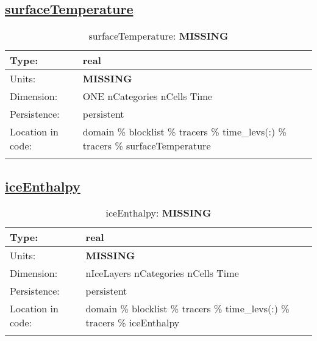 \subsection[surfaceTemperature]{\hyperref[sec:var_tab_tracers]{surfaceTemperature}}
\label{subsec:var_sec_tracers_surfaceTemperature}
\begin{center}
\begin{longtable}{| p{2.0in} | p{4.0in} |}
        \hline 
        Type: & real \\
        \hline 
        Units: & {\bf \color{red} MISSING} \\
        \hline 
        Dimension: & ONE nCategories nCells Time \\
        \hline 
        Persistence: & persistent \\
        \hline 
         Location in code: & domain \% blocklist \% tracers \% time\_levs(:) \% tracers \% surfaceTemperature \\
         \hline 
    \caption{surfaceTemperature: {\bf \color{red} MISSING}}
\end{longtable}
\end{center}
\subsection[iceEnthalpy]{\hyperref[sec:var_tab_tracers]{iceEnthalpy}}
\label{subsec:var_sec_tracers_iceEnthalpy}
\begin{center}
\begin{longtable}{| p{2.0in} | p{4.0in} |}
        \hline 
        Type: & real \\
        \hline 
        Units: & {\bf \color{red} MISSING} \\
        \hline 
        Dimension: & nIceLayers nCategories nCells Time \\
        \hline 
        Persistence: & persistent \\
        \hline 
         Location in code: & domain \% blocklist \% tracers \% time\_levs(:) \% tracers \% iceEnthalpy \\
         \hline 
    \caption{iceEnthalpy: {\bf \color{red} MISSING}}
\end{longtable}
\end{center}
